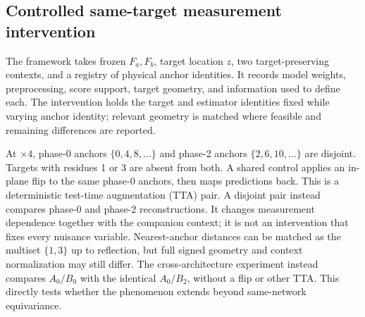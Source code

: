 \documentclass[10pt,twocolumn,letterpaper]{article}
\begin{document}
\subsection{Controlled same-target measurement intervention}
The framework takes frozen $F_a,F_b$, target location $z$, two target-preserving contexts, and a registry of physical anchor identities. It records model weights, preprocessing, score support, target geometry, and information used to define each. The intervention holds the target and estimator identities fixed while varying anchor identity; relevant geometry is matched where feasible and remaining differences are reported.

At $\times4$, phase-0 anchors $\{0,4,8,\ldots\}$ and phase-2 anchors $\{2,6,10,\ldots\}$ are disjoint. Targets with residues 1 or 3 are absent from both. A shared control applies an in-plane flip to the same phase-0 anchors, then maps predictions back. This is a deterministic test-time augmentation (TTA) pair. A disjoint pair instead compares phase-0 and phase-2 reconstructions. It changes measurement dependence together with the companion context; it is not an intervention that fixes every nuisance variable. Nearest-anchor distances can be matched as the multiset $\{1,3\}$ up to reflection, but full signed geometry and context normalization may still differ. The cross-architecture experiment instead compares $A_0/B_0$ with the identical $A_0/B_2$, without a flip or other TTA. This directly tests whether the phenomenon extends beyond same-network equivariance.
\end{document}
